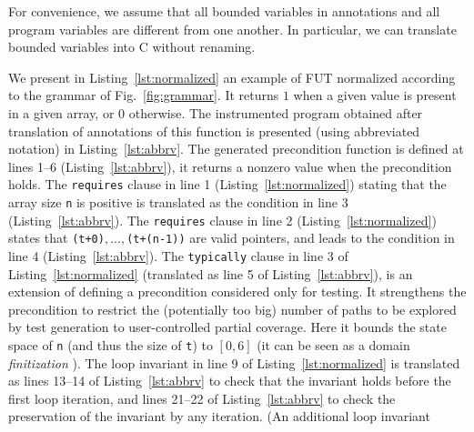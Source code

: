 For convenience, we assume that all bounded variables in annotations and all program variables are different
from one another.
In particular, we can translate bounded variables into C without renaming.





We present in Listing~\ref{lst:normalized} an example of FUT  
normalized according to the grammar of Fig.~\ref{fig:grammar}. It returns $1$
when a given value is present in a given array, or $0$ otherwise. The
instrumented program obtained after translation of annotations of this function
is presented  (using abbreviated notation) in Listing~\ref{lst:abbrv}. The generated  precondition function is
defined at lines 1--6 (Listing~\ref{lst:abbrv}), it returns a nonzero value when the
precondition holds. The \lstinline|requires| clause in line 1
(Listing~\ref{lst:normalized}) stating that the array size \lstinline|n| is
positive  is
translated as the condition in line 3 (Listing~\ref{lst:abbrv}).
The \lstinline|requires| clause in line 2 (Listing~\ref{lst:normalized}) states
that \lstinline|(t+0)|$, ..., $\lstinline|(t+(n-1))| are valid pointers, and leads
to the condition in line 4 (Listing~\ref{lst:abbrv}). The
\lstinline|typically| clause 
in line 3 of Listing~\ref{lst:normalized} (translated
as line 5  of Listing~\ref{lst:abbrv}), 
is an extension of 
\acsl defining a precondition
considered only for testing. It strengthens the precondition to restrict
the (potentially too big) number of paths to be explored by test generation to
user-controlled partial coverage. Here it bounds the state space of
\lstinline|n| (and thus the size of \lstinline|t|) to $[0, 6]$ (it can be seen
as a domain {\em finitization} \cite{Korat}).
The loop invariant in line 9 of Listing~\ref{lst:normalized} 
is translated as lines 13--14 of
Listing~\ref{lst:abbrv} to check that the invariant holds before the first loop
iteration, and lines 21--22 of Listing~\ref{lst:abbrv} to check the preservation of
the invariant by any iteration. (An additional loop invariant 
